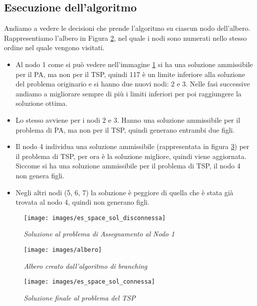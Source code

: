 \subsection{Esecuzione dell'algoritmo}
Andiamo a vedere le decisioni che prende l'algoritmo su ciascun nodo dell'albero. Rappresentiamo l'albero in Figura \ref{img:albero}, nel quale i nodi sono numerati nello stesso ordine nel quale vengono visitati.

\begin{itemize}
    \item Al nodo 1 come si può vedere nell'immagine \ref{img:es_space_sol_disconnessa} si ha una soluzione ammissibile per il PA, ma non per il TSP, quindi 117 è un limite inferiore alla soluzione del problema originario e si hanno due nuovi nodi: 2 e 3. Nelle fasi successive andiamo a migliorare sempre di più i limiti inferiori per poi raggiungere la soluzione ottima.
    \item Lo stesso avviene per i nodi 2 e 3. Hanno una soluzione ammissibile per il problema di PA, ma non per il TSP, quindi generano entrambi due figli.
    \item Il nodo 4 individua una soluzione ammissibile (rappresentata in figura \ref{img:es_space_sol_connessa}) per il problema di TSP, per ora è la soluzione migliore, quindi viene aggiornata. Siccome si ha una soluzione ammissibile per il problema di TSP, il nodo 4 non genera figli.
    \item Negli altri nodi (5, 6, 7) la soluzione è peggiore di quella che è stata già trovata al nodo 4, quindi non generano figli.
\end{itemize}

\begin{figure}[ht]
	\centering
	\texttt{[image: images/es\_space\_sol\_disconnessa]}
	\caption{\textit{Soluzione al problema di Assegnamento al Nodo 1}}
	\label{img:es_space_sol_disconnessa}
\end{figure}

\begin{figure}[ht]
	\centering
	\texttt{[image: images/albero]}
	\caption{\textit{Albero creato dall'algoritmo di branching}}
	\label{img:albero}
\end{figure}

\begin{figure}[ht]
	\centering
	\texttt{[image: images/es\_space\_sol\_connessa]}
	\caption{\textit{Soluzione finale al problema del TSP}}
	\label{img:es_space_sol_connessa}
\end{figure}
